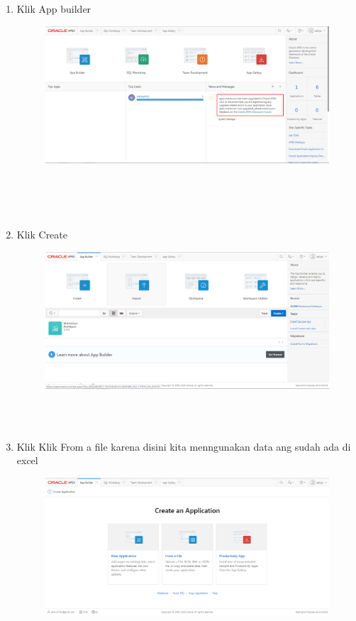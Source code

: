 \documentclass[12pt, times new roman, a4paper]{article}
\begin{document}
\begin{enumerate}
\item Klik App builder
\begin{figure} [h]
	\centering
		\includegraphics[scale=0.3]{gambar/2}
\end{figure}
\\
\\
\\
\item Klik Create
\begin{figure} [h]
	\centering
		\includegraphics[scale=0.4]{gambar/3}
\end{figure}
\\
\\
\item Klik Klik From a file karena disini kita menngunakan data ang sudah ada di excel
\begin{figure} [h]
	\centering
		\includegraphics[scale=0.4]{gambar/4}
\end{figure}


\end{enumerate}
\end{document}
